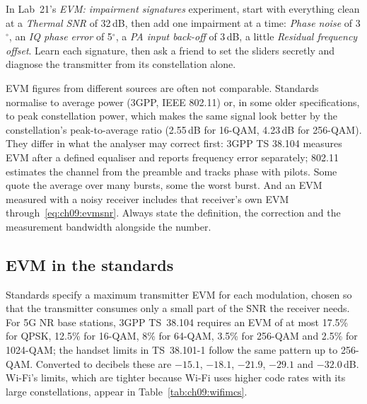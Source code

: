 \begin{tryit}
In Lab~21's \emph{EVM: impairment signatures} experiment, start with everything clean at a
\emph{Thermal SNR} of 32\,dB, then add one impairment at a time: \emph{Phase noise} of 3$^\circ$, an
\emph{IQ phase error} of 5$^\circ$, a \emph{PA input back-off} of 3\,dB, a little \emph{Residual
frequency offset}. Learn each signature,
then ask a friend to set the sliders secretly and diagnose the transmitter from its constellation
alone.
\end{tryit}

\begin{pitfall}
EVM figures from different sources are often not comparable. Standards normalise to average power
(3GPP, IEEE 802.11) or, in some older specifications, to peak constellation power, which makes the
same signal look better by the constellation's peak-to-average ratio (2.55\,dB for 16-QAM,
4.23\,dB for 256-QAM). They differ in what the analyser may correct first: 3GPP TS 38.104 measures
EVM after a defined equaliser and reports frequency error separately; 802.11 estimates the channel
from the preamble and tracks phase with pilots. Some quote the average over many bursts, some the
worst burst. And an EVM measured with a noisy receiver includes that receiver's own EVM
through~\eqref{eq:ch09:evmsnr}. Always state the definition, the correction and the measurement
bandwidth alongside the number.
\end{pitfall}

\subsection{EVM in the standards}

Standards specify a maximum transmitter EVM for each modulation, chosen so that the transmitter
consumes only a small part of the SNR the receiver needs. For 5G NR base stations, 3GPP TS~38.104
requires an EVM of at most 17.5\% for QPSK, 12.5\% for 16-QAM, 8\% for 64-QAM, 3.5\% for 256-QAM and
2.5\% for 1024-QAM; the handset limits in TS~38.101-1 follow the same pattern up to 256-QAM.
Converted to decibels these are $-15.1$, $-18.1$, $-21.9$, $-29.1$ and $-32.0$\,dB. Wi-Fi's limits,
which are tighter because Wi-Fi uses higher code rates with its large constellations, appear in
Table~\ref{tab:ch09:wifimcs}.


